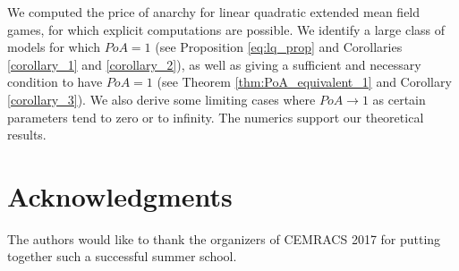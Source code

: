 \documentclass[11pt]{article}
\begin{document}
We computed the price of anarchy for linear quadratic extended mean field games, for which explicit computations are possible. We identify a large class of models for which $PoA=1$ (see Proposition \ref{eq:lq_prop} and Corollaries \ref{corollary_1} and \ref{corollary_2}), as well as giving a sufficient and necessary condition to have $PoA=1$ (see Theorem \ref{thm:PoA_equivalent_1} and Corollary \ref{corollary_3}). We also derive some limiting cases where $PoA \rightarrow 1$ as certain parameters tend to zero or to infinity. The numerics support our theoretical results.

\section{\textbf{Acknowledgments}}
The authors would like to thank the organizers of CEMRACS 2017 for putting together such a successful summer school.
\end{document}
